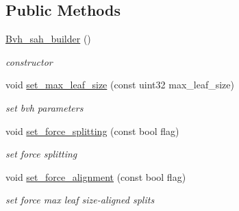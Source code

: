 \subsection*{Public Methods}
\begin{DoxyCompactItemize}
\item 
\mbox{\label{classcugar_1_1_bvh__sah__builder_a3b6da808634d49961463b686bf29ca3c}} 
\hyperlink{classcugar_1_1_bvh__sah__builder_a3b6da808634d49961463b686bf29ca3c}{Bvh\+\_\+sah\+\_\+builder} ()
\begin{DoxyCompactList}\small\item\em constructor \end{DoxyCompactList}\item 
\mbox{\label{classcugar_1_1_bvh__sah__builder_af625f11b29c4bd6b55ac0bd215f0f49d}} 
void \hyperlink{classcugar_1_1_bvh__sah__builder_af625f11b29c4bd6b55ac0bd215f0f49d}{set\+\_\+max\+\_\+leaf\+\_\+size} (const uint32 max\+\_\+leaf\+\_\+size)
\begin{DoxyCompactList}\small\item\em set bvh parameters \end{DoxyCompactList}\item 
\mbox{\label{classcugar_1_1_bvh__sah__builder_a960e29c62bb431f0623b515251468e83}} 
void \hyperlink{classcugar_1_1_bvh__sah__builder_a960e29c62bb431f0623b515251468e83}{set\+\_\+force\+\_\+splitting} (const bool flag)
\begin{DoxyCompactList}\small\item\em set force splitting \end{DoxyCompactList}\item 
\mbox{\label{classcugar_1_1_bvh__sah__builder_a38007d9e650d0dfced01fce266bc77ae}} 
void \hyperlink{classcugar_1_1_bvh__sah__builder_a38007d9e650d0dfced01fce266bc77ae}{set\+\_\+force\+\_\+alignment} (const bool flag)
\begin{DoxyCompactList}\small\item\em set force \textquotesingle{}max leaf size\textquotesingle{}-\/aligned splits \end{DoxyCompactList}\item 
\mbox{\label{classcugar_1_1_bvh__sah__builder_a41aae31b7766827a2034bc092f3ca2f0}} 

\end{DoxyCompactItemize}
